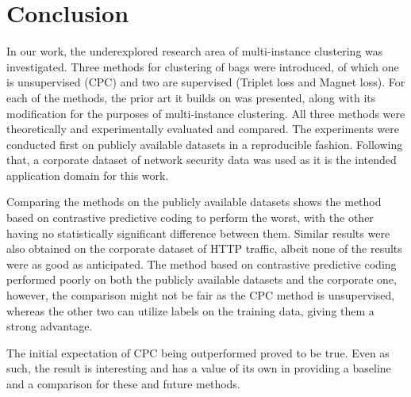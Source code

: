 \section{Conclusion}

In our work, the underexplored research area of multi-instance clustering was investigated. Three methods for clustering of bags were introduced, of which one is unsupervised (CPC) and two are supervised (Triplet loss and Magnet loss). For each of the methods, the prior art it builds on was presented, along with its modification for the purposes of multi-instance clustering. All three methods were theoretically and experimentally evaluated and compared. The experiments were conducted first on publicly available datasets in a reproducible fashion. Following that, a corporate dataset of network security data was used as it is the intended application domain for this work.

Comparing the methods on the publicly available datasets shows the method based on contrastive predictive coding to perform the worst, with the other having no statistically significant difference between them. Similar results were also obtained on the corporate dataset of HTTP traffic, albeit none of the results were as good as anticipated. The method based on contrastive predictive coding performed poorly on both the publicly available datasets and the corporate one, however, the comparison might not be fair as the CPC method is unsupervised, whereas the other two can utilize labels on the training data, giving them a strong advantage.

The initial expectation of CPC being outperformed proved to be true. Even as such, the result is interesting and has a value of its own in providing a baseline and a comparison for these and future methods.
